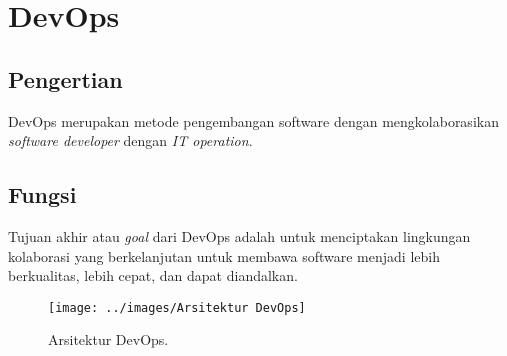 \chapter{DevOps}

\section{Pengertian}
DevOps merupakan metode pengembangan software dengan mengkolaborasikan \textit{software developer} dengan \textit{IT operation}. 
\section{Fungsi}
Tujuan akhir atau \textit{goal} dari DevOps adalah untuk menciptakan lingkungan kolaborasi yang berkelanjutan untuk membawa software menjadi lebih berkualitas, lebih cepat, dan dapat diandalkan.
\begin{figure}[h]
	\centering
	\texttt{[image: ../images/Arsitektur DevOps]}
	\caption{Arsitektur DevOps.}
	\label{fig:Arsitektur DevOps}
\end{figure}
